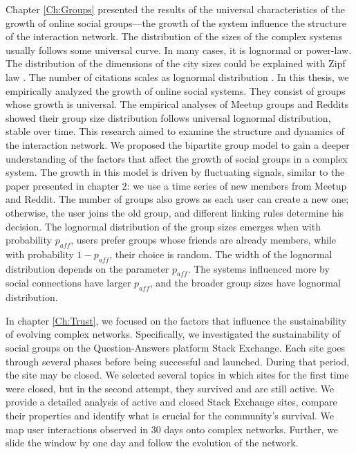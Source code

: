 Chapter \ref{Ch:Groups} presented the results of the universal characteristics of the growth of online social groups—the growth of the system influence the structure of the interaction network. The distribution of the sizes of the complex systems usually follows some universal curve. In many cases, it is lognormal or power-law. The distribution of the dimensions of the city sizes could be explained with Zipf law \cite{gabaix1999}. The number of citations scales as lognormal distribution \cite{radicchi2008}. In this thesis, we empirically analyzed the growth of online social systems. They consist of groups whose growth is universal. The empirical analyses of Meetup groups and Reddits showed their group size distribution follows universal lognormal distribution, stable over time. This research aimed to examine the structure and dynamics of the interaction network. We proposed the bipartite group model to gain a deeper understanding of the factors that affect the growth of social groups in a complex system. The growth in this model is driven by fluctuating signals, similar to the paper presented in chapter 2: we use a time series of new members from Meetup and Reddit. The number of groups also grows as each user can create a new one; otherwise, the user joins the old group, and different linking rules determine his decision. The lognormal distribution of the group sizes emerges when with probability $p_{aff}$, users prefer groups whose friends are already members, while with probability $1-p_{aff}$, their choice is random. The width of the lognormal distribution depends on the parameter $p_{aff}$. The systems influenced more by social connections have larger $p_{aff}$, and the broader group sizes have lognormal distribution.

In chapter \ref{Ch:Trust}, we focused on the factors that influence the sustainability of evolving complex networks. Specifically, we investigated the sustainability of social groups on the Question-Answers platform Stack Exchange. 
Each site goes through several phases before being successful and launched. During that period, the site may be closed. We selected several topics in which sites for the first time were closed, but in the second attempt, they survived and are still active. We provide a detailed analysis of active and closed Stack Exchange sites, compare their properties and identify what is crucial for the community's survival. We map user interactions observed in 30 days onto complex networks. Further, we slide the window by one day and follow the evolution of the network. 

